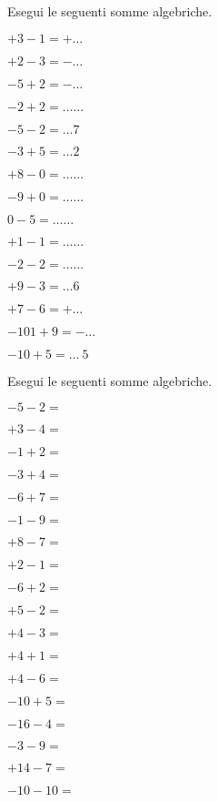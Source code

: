 \begin{esercizio}
Esegui le seguenti somme algebriche.
 \label{ese:2.14}
 \begin{multicols}{3}
 \begin{enumeratea}
 \item \(+3 -1 = +\ldots\)
 \item \(+2 -3 = -\ldots\)
 \item \(-5 +2 = -\ldots\)
 \item \(-2 +2 = \ldots\ldots\)
 \item \(-5 -2 = \ldots7\)
 \item \(-3 +5 = \ldots2\)
 \item \(+8 -0 = \ldots\ldots\)
 \item \(-9 +0 = \ldots\ldots\)
 \item \(0 -5 = \ldots\ldots\)
 \item \(+1 -1 = \ldots\ldots\)
 \item \(-2 -2 = \ldots\ldots\)
 \item \(+9 -3 = \ldots6\)
 \item \(+7 -6 = +\ldots\)
 \item \(-101 +9 = -\ldots\)
 \item \(-10 +5 = \ldots~5\)
 \end{enumeratea}
 \end{multicols}
\end{esercizio}

\begin{esercizio}
 \label{ese:2.15}
Esegui le seguenti somme algebriche.
\begin{multicols}{3}
 \begin{enumeratea}
 \item \(-5 -2 =\)
 \item \(+3 -4 =\)
 \item \(-1 +2 =\)
 \item \(-3 +4 =\)
 \item \(-6 +7 =\)
 \item \(-1 -9 =\)
 \item \(+8 -7 =\)
 \item \(+2 -1 =\)
 \item \(-6 +2 =\)
 \item \(+5 -2 =\)
 \item \(+4 -3 =\)
 \item \(+4 +1 =\)
 \item \(+4 -6 =\)
 \item \(-10 +5 =\)
 \item \(-16 -4 =\)
 \item \(-3 -9 =\)
 \item \(+14 -7 =\)
 \item \(-10 -10 =\)
 \end{enumeratea}

\end{multicols}

\end{esercizio}

